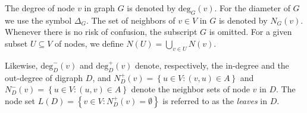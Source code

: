 


The degree of node $v$ in graph $G$ is denoted by $\text{deg}_G(v)$.
For the diameter of $G$ we use the symbol $\Delta_G$.
The set of neighbors of $v\in V$ in $G$ is denoted by $N_G(v)$.
Whenever there is no risk of confusion, the subscript $G$ is omitted.
For a given subset $U\subseteq V$ of nodes, we define $N(U)=\bigcup_{v\in U}N(v)$.

Likewise, $\text{deg}^-_D(v)$ and $\text{deg}^+_D(v)$ denote, respectively, the in-degree and the out-degree of digraph $D$,
and $N_D^+(v)=\left\{u\in V:(v,u)\in A\right\}$ and $N_D^-(v)=\left\{u\in V:(u,v)\in A\right\}$ denote the neighbor sets of node $v$ in $D$.
The node set $L(D)=\left\{v\in V: N_D^+(v)=\emptyset\right\}$ is referred to as the \emph{leaves} in $D$.



